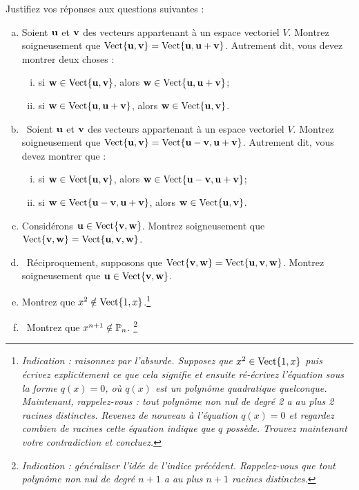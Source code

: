 \begin{prob}
\end{prob} \begin{prob} \label{prob06.4} Justifiez vos réponses aux questions suivantes :
\medskip
\begin{enumerate}[a)]
\item Soient $\uu$ et $\vv$ des vecteurs appartenant à un espace vectoriel $V$. Montrez soigneusement que $\sp{\uu,\vv}=\sp{\uu, \uu+\vv}$. Autrement dit, vous devez montrer deux choses :
\begin{enumerate}[(i)]
\item si $\ww\in \sp{\uu,\vv}$, alors $\ww \in \sp{\uu, \uu+\vv}$;
\item si $\ww\in \sp{\uu, \uu+\vv}$, alors $\ww\in \sp{\uu,\vv}$.
\end{enumerate}
\medskip

\item\sov~Soient $\uu$ et $\vv$ des vecteurs appartenant à un espace vectoriel $V$. Montrez soigneusement que $\sp{\uu,\vv}=\sp{\uu-\vv, \uu+\vv}$. Autrement dit, vous devez montrer que :
\begin{enumerate}[(i)]
\item si $\ww\in \sp{\uu,\vv}$, alors $\ww \in \sp{\uu-\vv, \uu+\vv}$;
\item si $\ww\in \sp{\uu-\vv, \uu+\vv}$, alors $\ww\in \sp{\uu,\vv}$.
\end{enumerate}
\medskip


\item Considérons $\uu  \in \sp{\vv,\ww}$. Montrez soigneusement que $\sp{\vv,\ww}=\sp{\uu,\vv,\ww}$.
\medskip


\item\sov~Réciproquement, supposons que $\sp{\vv,\ww}=\sp{\uu,\vv,\ww}$. Montrez soigneusement que $\uu \in \sp{\vv,\ww}$.
\medskip

\item Montrez que $x^2 \notin \sp{1,x}$.\footnote{\it Indication : raisonnez par l'absurde. Supposez que $x^2 \in \sp{1,x}$ puis \'ecrivez explicitement ce que cela signifie et ensuite ré-écrivez l'équation sous la forme $q(x)=0$, où $q(x)$ est un polynôme quadratique quelconque. Maintenant, rappelez-vous : tout polynôme non nul de degré 2 a au plus 2 racines distinctes. Revenez de nouveau à l'équation $q(x)=0$ et regardez combien de racines cette équation indique que $q$ possède. Trouvez maintenant votre contradiction et concluez.}
\medskip

\item\sov~Montrez que $x^{n+1} \notin \PP_n$. \footnote{\it Indication : généraliser l'idée de l'indice précédent. Rappelez-vous que tout polynôme non nul de degré $n+1$ a au plus $n+1$ racines distinctes.}
\medskip


\end{enumerate}
\end{prob}
